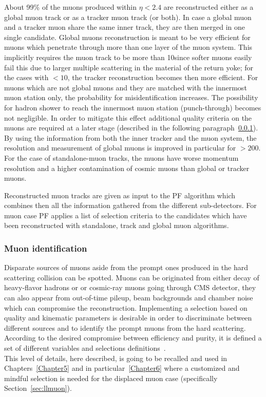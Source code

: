 About 99\% of the muons produced within $\eta < 2.4$ are reconstructed
either as a global muon track or as a tracker muon track (or
both). In case a global muon and a tracker muon share the same inner
track, they are then merged in one single candidate.
Global muons reconstruction is meant to be very efficient for muons
which penetrate
through more than one layer of the muon system. This implicitly
requires the muon track \pt to be more than 10\GeV since softer muons
easily fail this due to larger multiple scattering in the material of the return yoke; for the cases with
\pt$< 10$\GeV, the tracker reconstruction becomes then more efficient.
For muons which are not global muons and
they are matched with the innermost muon station only,
the probability for misidentification increases. The possibility for
hadron shower to reach the innermost muon station (punch-through)
becomes not negligible. In order to mitigate this effect additional
quality criteria on the muons are required at a later stage (described
in the following paragraph~\ref{sec:c2muonselection}).
By using the information from both the
inner tracker and the muon
system, the \pt resolution and measurement of global muons is improved
in particular for \pt $> 200$\GeV. For the case of standalone-muon
tracks, the muons have worse momentum resolution and a higher
contamination of cosmic muons than global or tracker muons.

Reconstructed muon tracks are given as input to the PF algorithm which
combines then all the information gathered from the different
sub-detectors. For muon case PF applies a list of selection criteria
to the candidates which have been reconstructed with standalone, track
and global muon algorithms. 

\subsubsection{Muon identification}\label{sec:c2muonselection}

Disparate sources of muons aside from the
prompt ones produced in the hard scattering collision can be spotted.
Muons can be
originated from either decay of heavy-flavor
hadrons or or cosmic-ray muons going through CMS detector, they can also appear from out-of-time pileup, beam
backgrounds and chamber noise which can compromise the reconstruction.
Implementing a selection based on quality and 
kinematic parameters is desirable in order to discriminate between different sources and to identify the
prompt muons from the hard scattering.\\
According to the desired compromise between efficiency and purity, it
is defined a set of different variables and selections definitions~\cite{Sirunyan_2018_muon}.\\
This level of details, here described, is going to be recalled and
used in Chapters~\ref{Chapter5} and in particular~\ref{Chapter6} where a customized and mindful selection is needed
for the displaced muon case (specifically Section~\ref{sec:llmuon}).

